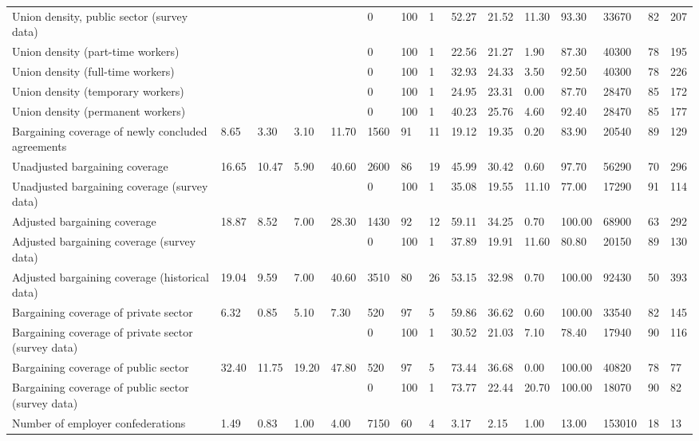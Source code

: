 \begin{longtable}{lllllllllllllll}
Union density, public sector (survey data) &  &  &  &  & 0 & 100 & 1 & 52.27 & 21.52 & 11.30 & 93.30 & 33670 & 82 & 207\\
Union density (part-time workers) &  &  &  &  & 0 & 100 & 1 & 22.56 & 21.27 & 1.90 & 87.30 & 40300 & 78 & 195\\
Union density (full-time workers) &  &  &  &  & 0 & 100 & 1 & 32.93 & 24.33 & 3.50 & 92.50 & 40300 & 78 & 226\\
Union density (temporary workers) &  &  &  &  & 0 & 100 & 1 & 24.95 & 23.31 & 0.00 & 87.70 & 28470 & 85 & 172\\
\addlinespace
Union density (permanent workers) &  &  &  &  & 0 & 100 & 1 & 40.23 & 25.76 & 4.60 & 92.40 & 28470 & 85 & 177\\
Bargaining coverage of newly concluded agreements & 8.65 & 3.30 & 3.10 & 11.70 & 1560 & 91 & 11 & 19.12 & 19.35 & 0.20 & 83.90 & 20540 & 89 & 129\\
Unadjusted bargaining coverage & 16.65 & 10.47 & 5.90 & 40.60 & 2600 & 86 & 19 & 45.99 & 30.42 & 0.60 & 97.70 & 56290 & 70 & 296\\
Unadjusted bargaining coverage (survey data) &  &  &  &  & 0 & 100 & 1 & 35.08 & 19.55 & 11.10 & 77.00 & 17290 & 91 & 114\\
Adjusted bargaining coverage & 18.87 & 8.52 & 7.00 & 28.30 & 1430 & 92 & 12 & 59.11 & 34.25 & 0.70 & 100.00 & 68900 & 63 & 292\\
\addlinespace
Adjusted bargaining coverage (survey data) &  &  &  &  & 0 & 100 & 1 & 37.89 & 19.91 & 11.60 & 80.80 & 20150 & 89 & 130\\
Adjusted bargaining coverage (historical data) & 19.04 & 9.59 & 7.00 & 40.60 & 3510 & 80 & 26 & 53.15 & 32.98 & 0.70 & 100.00 & 92430 & 50 & 393\\
Bargaining coverage of private sector & 6.32 & 0.85 & 5.10 & 7.30 & 520 & 97 & 5 & 59.86 & 36.62 & 0.60 & 100.00 & 33540 & 82 & 145\\
Bargaining coverage of private sector (survey data) &  &  &  &  & 0 & 100 & 1 & 30.52 & 21.03 & 7.10 & 78.40 & 17940 & 90 & 116\\
Bargaining coverage of public sector & 32.40 & 11.75 & 19.20 & 47.80 & 520 & 97 & 5 & 73.44 & 36.68 & 0.00 & 100.00 & 40820 & 78 & 77\\
\addlinespace
Bargaining coverage of public sector (survey data) &  &  &  &  & 0 & 100 & 1 & 73.77 & 22.44 & 20.70 & 100.00 & 18070 & 90 & 82\\
Number of employer confederations & 1.49 & 0.83 & 1.00 & 4.00 & 7150 & 60 & 4 & 3.17 & 2.15 & 1.00 & 13.00 & 153010 & 18 & 13\\

\end{longtable}
